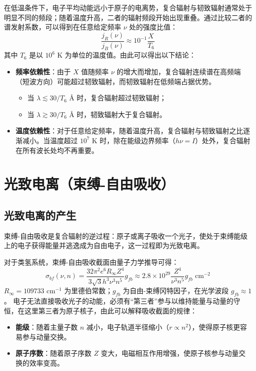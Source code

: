\begin{derivationnote}[复合辐射与韧致辐射再次比较]
    在低温条件下，电子平均动能远小于原子的电离势，复合辐射与韧致辐射通常处于明显不同的频段；随着温度升高，二者的辐射频段开始出现重叠。通过比较二者的谱发射系数，可以得到在任意给定频率 $\nu$ 处的强度比值：
    \begin{equation}
        \frac{j_R(\nu)}{j_B(\nu)} \approx 10^{-1} \frac{X}{T_6} \nonumber
    \end{equation}
    其中 $T_6$ 是以 $10^6 \text{ K}$ 为单位的温度值。由此可以得出以下结论：
    
    \begin{itemize}
        \item \textbf{频率依赖性}：由于 $X$ 值随频率 $\nu$ 的增大而增加，复合辐射连续谱在高频端（短波方向）可能超过韧致辐射，而韧致辐射在低频端占据优势。
        \begin{itemize}
            \item 当 $\lambda \lesssim 30/T_6 \text{ \AA}$ 时，复合辐射超过韧致辐射；
            \item 当 $\lambda \gtrsim 30/T_6 \text{ \AA}$ 时，韧致辐射大于复合辐射。
        \end{itemize}
        \item \textbf{温度依赖性}：对于任意给定频率，随着温度升高，复合辐射与韧致辐射之比逐渐减小。当温度超过 $10^7 \text{ K}$ 时，除在能级边界频率（$h\nu = I$）处外，复合辐射在所有波长处均不再重要。
    \end{itemize}
\end{derivationnote}

\section{光致电离（束缚-自由吸收）}
\subsection{光致电离的产生}
束缚-自由吸收是复合辐射的逆过程：原子或离子吸收一个光子，使处于束缚能级上的电子获得能量并逃逸成为自由电子，这一过程即为光致电离。

对于类氢系统，束缚-自由吸收截面由量子力学推导可得：
\begin{equation}
    \sigma_{bf}(\nu, n) = \frac{32\pi^2 e^6 R_{\infty} Z^4}{3\sqrt{3} h^3 \nu^3 n^5} g_{fb} \approx 2.8 \times 10^{29} \frac{Z^4}{\nu^3 n^5} g_{fb} \text{ cm}^{-2}
\end{equation}
$R_{\infty} = 109733 \text{ cm}^{-1}$ 为里德伯常数；$g_{fb}$ 为自由-束缚冈特因子，在光学波段 $g_{fb} \approx 1$。
电子无法直接吸收光子的动能，必须有“第三者”参与以维持能量与动量的守恒，在这里第三者为原子核子，由此可以解释吸收截面的规律：
\begin{itemize}
    \item \textbf{能级}：随着主量子数 $n$ 减小，电子轨道半径缩小（$r \propto n^2$），使得原子核更容易参与动量交换。
    \item \textbf{原子序数}：随着原子序数 $Z$ 变大，电磁相互作用增强，使原子核参与动量交换的效率变高。
\end{itemize}

